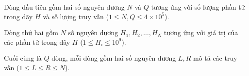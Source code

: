 Dòng đầu tiên gồm hai số nguyên dương $N$ và $Q$ tương ứng với số lượng phần tử trong dãy $H$ và số lượng truy vấn ($1\le N,Q\le 4\times 10^5$).

Dòng thứ hai gồm $N$ số nguyên dương $H_1,H_2,\dots,H_N$ tương ứng với giá trị của các phần tử trong dãy $H$ ($1\le H_i\le 10^9$).

Cuối cùng là $Q$ dòng, mỗi dòng gồm hai số nguyên dương $L,R$ mô tả các truy vấn ($1\le L\le R\le N$).
